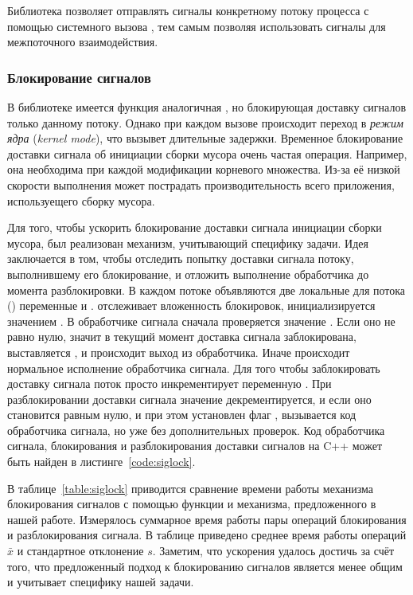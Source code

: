 Библиотека  позволяет отправлять сигналы конкретному потоку процесса с 
помощью системного вызова , тем самым позволяя использовать сигналы 
для межпоточного взаимодействия.


\subsubsection{Блокирование сигналов}
В библиотеке  имеется функция  аналогичная 
, но блокирующая доставку сигналов только данному потоку. 
Однако при каждом вызове  происходит переход в \emph{режим ядра} 
(\emph{kernel mode}), что вызывет длительные задержки. 
Временное блокирование доставки сигнала об инициации сборки мусора очень частая операция. 
Например, она необходима при каждой модификации корневого множества. 
Из-за её низкой скорости выполнения может пострадать производительность всего приложения, 
используещего сборку мусора. 

Для того, чтобы ускорить блокирование доставки сигнала инициации сборки мусора, был 
реализован механизм, учитывающий специфику задачи. 
Идея заключается в том, чтобы отследить попытку доставки сигнала потоку, выполнившему его 
блокирование, и отложить выполнение обработчика до момента разблокировки. 
В каждом потоке объявляются две локальные для потока () переменные 
 и .  отслеживает вложенность блокировок, 
 инициализируется значением . 
В обработчике сигнала сначала проверяется значение . 
Если оно не равно нулю, значит в текущий момент доставка сигнала заблокирована, 
выставляется , и происходит выход из обработчика. 
Иначе происходит нормальное исполнение обработчика сигнала. 
Для того чтобы заблокировать доставку сигнала поток просто инкрементирует переменную 
. 
При разблокировании доставки сигнала значение  декрементируется, и если оно 
становится равным нулю, и при этом установлен флаг , вызывается код 
обработчика сигнала, но уже без дополнительных проверок. 
Код обработчика сигнала, блокирования и разблокирования доставки сигналов на C++ может быть 
найден в листинге~\ref{code:siglock}.

В таблице~\ref{table:siglock} приводится сравнение времени работы механизма блокирования 
сигналов с помощью функции  и механизма, предложенного в нашей работе. 
Измерялось суммарное время работы пары операций блокирования и разблокирования сигнала. 
В таблице приведено среднее время работы операций $\bar{x}$ и стандартное отклонение $s$. 
Заметим, что ускорения удалось достичь за счёт того, что предложенный подход к блокированию 
сигналов является менее общим и учитывает специфику нашей задачи.

